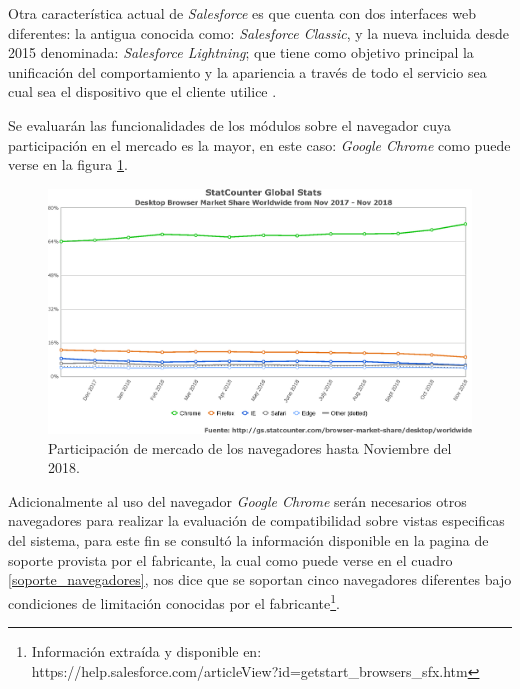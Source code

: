 Otra característica actual de \emph{Salesforce} es que cuenta con dos interfaces
web diferentes: la antigua conocida como: \emph{Salesforce Classic}, y la nueva
incluida desde 2015 denominada: \emph{Salesforce Lightning}; que tiene como
objetivo principal la unificación del comportamiento y la apariencia a través de
todo el servicio sea cual sea el dispositivo que el cliente
utilice \cite{McCarthy}.

Se evaluarán las funcionalidades de los módulos sobre el navegador cuya
participación en el mercado es la mayor, en este caso: \emph{Google Chrome}
como puede verse en la figura \ref{software}.

\begin{figure}[H]
\centering
\includegraphics[width=1.0\textwidth]{graphics/compatibilidad.eps}
\caption{Participación de mercado de los navegadores hasta Noviembre del 2018.}
\label{software}
\end{figure}

Adicionalmente al uso del navegador \emph{Google Chrome} serán necesarios
otros navegadores para realizar la evaluación de compatibilidad sobre
vistas especificas del sistema, para este fin se consultó la información
disponible en la pagina de soporte provista por el fabricante, la cual como
puede verse en el cuadro \ref{soporte_navegadores}, nos dice que se soportan
cinco navegadores diferentes bajo condiciones de limitación conocidas por el
fabricante\footnote{Información extraída y disponible en:
https://help.salesforce.com/articleView?id=getstart\_browsers\_sfx.htm}.


